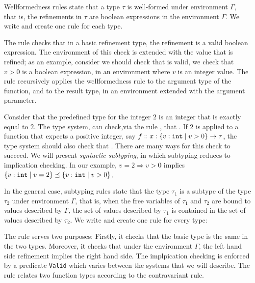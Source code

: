 Wellformedness rules  
state that a type $\tau$ is well-formed under environment
$\Gamma$, that is, the refinements in $\tau$ are boolean 
expressions in the environment $\Gamma$.
%
We write \isWellFormed{\Gamma}{\tau} and create one rule for each type.

The rule \wtBase checks that in a basic refinement type,  
the refinement is a valid boolean expression.
The environment of this check is extended with the value that is refined;
as an example, consider 
we should check that  is valid, 
we check that $v > 0$ is a boolean expression, in an 
environment where $v$ is an integer value.
%
The rule \wtFun recursively applies the wellformedness rule to
the argument type of the function, and to the result type, 
in an environment extended with the argument parameter.

Consider that the predefined type for the integer $2$
is an integer that is exactly equal to $2$.
The type system, can check,via the rule \tconst , that 
.
If $2$ is applied to a function that expects a
positive integer, say $f::{x:\left\lbrace v : \texttt{int}\mid v>0\right\rbrace} \rightarrow \tau$,
the type system should also check that 
.
%
There are many ways for this check to succeed.
We will present \textit{syntactic subtyping},
in which subtyping reduces to implication checking.
In our example, $v = 2 \Rightarrow v > 0 $ implies 
$\left\lbrace v : \texttt{int}\mid v=2\right\rbrace \preceq \left\lbrace v : \texttt{int}\mid v>0\right\rbrace$.


In the general case, subtyping rules
state that the type $\tau_1$ is a subtype of the type
$\tau_2$ under environment $\Gamma$, that is, when the free variables
of $\tau_1$ and $\tau_2$
are bound to values described by $\Gamma$, the set of values described
by $\tau_1$ is contained in the set of values described by $\tau_2$. 
We write  and create one rule for every type:

The rule \tsubBase serves two purposes:
Firstly,
it checks that the basic type is the same in the two types.
Moreover, it checks that under the environment $\Gamma$, 
the left hand side refinement implies the right hand side.
The implpication checking is enforced by a predicate \texttt{Valid} 
which varies between the systems that we will describe.
%
The rule \tsubFun relates two function types according to the contravariant rule.


